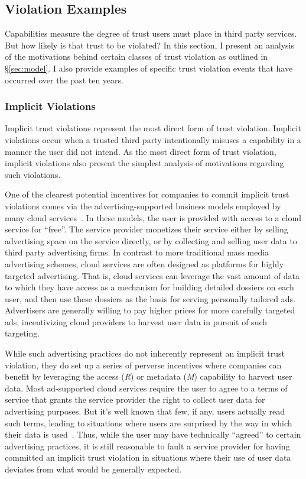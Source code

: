 \subsection{Violation Examples}
\label{sec:analysis:violations}

Capabilities measure the degree of trust users must place in third
party services. But how likely is that trust to be violated? In this
section, I present an analysis of the motivations behind certain
classes of trust violation as outlined in \S\ref{sec:model}. I also
provide examples of specific trust violation events that have occurred
over the past ten years.

\subsubsection{Implicit Violations}

Implicit trust violations represent the most direct form of trust
violation. Implicit violations occur when a trusted third party
intentionally misuses a capability in a manner the user did not
intend. As the most direct form of trust violation, implicit
violations also present the simplest analysis of motivations regarding
such violations.

One of the clearest potential incentives for companies to commit
implicit trust violations comes via the advertising-supported business
models employed by many cloud services~\cite{evans2009}. In these
models, the user is provided with access to a cloud service for
``free''. The service provider monetizes their service either by
selling advertising space on the service directly, or by collecting
and selling user data to third party advertising firms. In contrast to
more traditional mass media advertising schemes, cloud services are
often designed as platforms for highly targeted advertising. That is,
cloud services can leverage the vast amount of data to which they have
access as a mechanism for building detailed dossiers on each user, and
then use these dossiers as the basis for serving personally tailored
ads. Advertisers are generally willing to pay higher prices for more
carefully targeted ads, incentivizing cloud providers to harvest user
data in pursuit of such targeting.

While such advertising practices do not inherently represent an
implicit trust violation, they do set up a series of perverse
incentives where companies can benefit by leveraging the access
(\emph{R}) or metadata (\emph{M}) capability to harvest user
data. Most ad-supported cloud services require the user to agree to a
terms of service that grants the service provider the right to collect
user data for advertising purposes. But it's well known that few, if
any, users actually read such terms, leading to situations where users
are surprised by the way in which their data is used~\cite{ hern2015,
  mcdonald2010}. Thus, while the user may have technically ``agreed''
to certain advertising practices, it is still reasonable to fault a
service provider for having committed an implicit trust violation in
situations where their use of user data deviates from what would be
generally expected.

